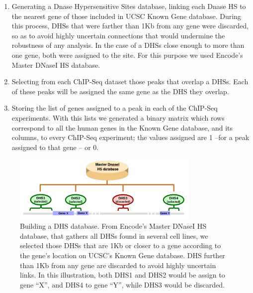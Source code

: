 \documentclass[a4paper, 12pt ]{article}
\begin{document}
\begin{enumerate}
	\item Generating a Dnase Hypersensitive Sites database, linking each Dnase HS to the nearest gene of those included in UCSC Known Gene database\cite{KnownGene}. During this process, DHSs that were farther than 1Kb from any gene were discarded, so as to avoid highly uncertain connections that would undermine the robustness of any analysis. In the case of a DHSs close enough to more than one gene, both were assigned to the site. For this purpose we used Encode’s  Master DNaseI HS database\cite{EncodeDHS1}\cite{EncodeDHS2}.

	\item Selecting from each ChIP-Seq dataset those peaks that overlap a DHSs. Each of these peaks will be assigned the same gene as the DHS they overlap.
	
	\item Storing the list of genes assigned to a peak in each of the ChIP-Seq experiments. With this lists we generated a binary matrix which rows correspond to all the human genes in the Known Gene database, and its columns, to every ChIP-Seq experiment; the values assigned are 1 –for a peak assigned to that gene – or 0.
	
\end{enumerate}
\begin{figure}[h]
	\centering
	\includegraphics[width=0.8\textwidth]{graf-dhs}
	\caption{Building a DHS database. From Encode’s Master DNaseI HS database, that gathers all DHSs found in several cell lines, we selected those DHSs that are 1Kb or closer to a gene according to the gene’s location on UCSC’s Known Gene database. DHS further than 1Kb from any gene are discarded to avoid highly uncertain links.
	In this illustration, both DHS1 and DHS2 would be assign to gene “X”, and DHS4 to gene “Y”, while DHS3 would be discarded.}
\end{figure}
\end{document}
